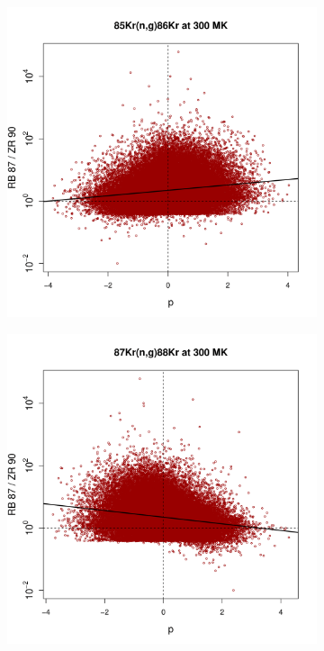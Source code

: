 \begin{figure}[!p]
\begin{subfigure}[b]{0.495\textwidth}
\end{subfigure}
\begin{subfigure}[b]{0.495\textwidth}   
\centering 
\includegraphics[width=\textwidth]{Chapter-3/figs/CorrRB87ZR90_85Kr_n_g_86Kr_300MK.png}
\end{subfigure}
\hfill
\begin{subfigure}[b]{0.495\textwidth}   
\centering 
\includegraphics[width=\textwidth]{Chapter-3/figs/CorrRB87ZR90_87Kr_n_g_88Kr_300MK.png}

\end{subfigure}
\end{figure}
